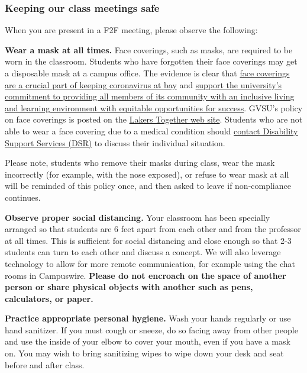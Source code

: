 \documentclass[]{article}
\begin{document}
\hypertarget{keeping-our-class-meetings-safe}{%
\subsubsection{Keeping our class meetings
safe}\label{keeping-our-class-meetings-safe}}

When you are present in a F2F meeting, please observe the following:

\textbf{Wear a mask at all times.} Face coverings, such as masks, are
required to be worn in the classroom. Students who have forgotten their
face coverings may get a disposable mask at a campus office. The
evidence is clear that
\href{https://www.wbtv.com/2020/06/29/demonstration-aims-show-effectiveness-masks/}{face
coverings are a crucial part of keeping coronavirus at bay} and
\href{https://www.gvsu.edu/inclusion/suggested-syllabus-language-for-inclusion-and-equity-132.htm}{support
the university's commitment to providing all members of its community
with an inclusive living and learning environment with equitable
opportunities for success}. GVSU's policy on face coverings is posted on
the
\href{https://www.gvsu.edu/lakerstogether/face-covering-policy-27.htm}{Lakers
Together web site}. Students who are not able to wear a face covering
due to a medical condition should
\href{https://www.gvsu.edu/dsr/}{contact Disability Support Services
(DSR)} to discuss their individual situation.

Please note, students who remove their masks during class, wear the mask
incorrectly (for example, with the nose exposed), or refuse to wear mask
at all will be reminded of this policy once, and then asked to leave if
non-compliance continues.

\textbf{Observe proper social distancing.} Your classroom has been
specially arranged so that students are 6 feet apart from each other and
from the professor at all times. This is sufficient for social
distancing and close enough so that 2-3 students can turn to each other
and discuss a concept. We will also leverage technology to allow for
more remote communication, for example using the chat rooms in
Campuswire. \textbf{Please do not encroach on the space of another
person or share physical objects with another such as pens, calculators,
or paper.}

\textbf{Practice appropriate personal hygiene.} Wash your hands
regularly or use hand sanitizer. If you must cough or sneeze, do so
facing away from other people and use the inside of your elbow to cover
your mouth, even if you have a mask on. You may wish to bring sanitizing
wipes to wipe down your desk and seat before and after class.
\end{document}
